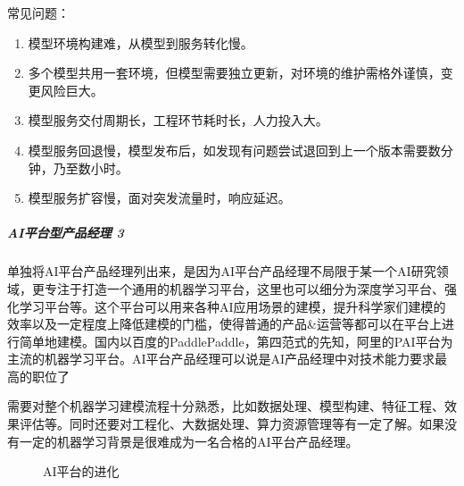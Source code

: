 \documentclass[letterpaper,10pt,english]{sphinxmanual}
\begin{document}
常见问题：%
\begin{footnote}[130]\sphinxAtStartFootnote
{}
%
\end{footnote}
\begin{enumerate}
%
\item {} 
模型环境构建难，从模型到服务转化慢。

\item {} 
多个模型共用一套环境，但模型需要独立更新，对环境的维护需格外谨慎，变更风险巨大。

\item {} 
模型服务交付周期长，工程环节耗时长，人力投入大。

\item {} 
模型服务回退慢，模型发布后，如发现有问题尝试退回到上一个版本需要数分钟，乃至数小时。

\item {} 
模型服务扩容慢，面对突发流量时，响应延迟。

\end{enumerate}


\subparagraph{AI平台型产品经理 3\sphinxfootnotemark[131]}
\label{\detokenize{chapter_introduction/platform:ai-3}}%
\begin{footnotetext}[131]\sphinxAtStartFootnote
{}
%
\end{footnotetext}\ignorespaces 
单独将AI平台产品经理列出来，是因为AI平台产品经理不局限于某一个AI研究领域，更专注于打造一个通用的机器学习平台，这里也可以细分为深度学习平台、强化学习平台等。这个平台可以用来各种AI应用场景的建模，提升科学家们建模的效率以及一定程度上降低建模的门槛，使得普通的产品\&运营等都可以在平台上进行简单地建模。国内以百度的Paddle\sphinxhyphen{}Paddle，第四范式的先知，阿里的PAI平台为主流的机器学习平台。AI平台产品经理可以说是AI产品经理中对技术能力要求最高的职位了

需要对整个机器学习建模流程十分熟悉，比如数据处理、模型构建、特征工程、效果评估等。同时还要对工程化、大数据处理、算力资源管理等有一定了解。如果没有一定的机器学习背景是很难成为一名合格的AI平台产品经理。

\begin{figure}[H]
\centering
\capstart

\noindent{}
\caption{AI平台的进化}\label{\detokenize{chapter_introduction/platform:id14}}\end{figure}
\end{document}
